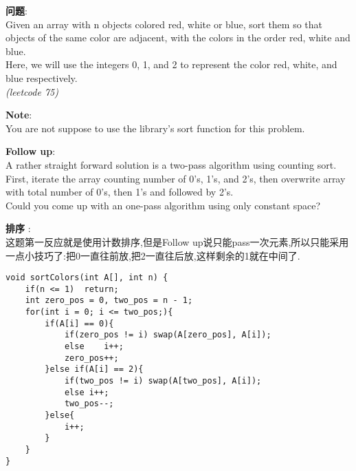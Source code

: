     
\begin{description}
    \item{\textbf{问题}}:\\
Given an array with n objects colored red, white or blue, sort them so that objects of the same color are adjacent, with the colors in the order red, white and blue.\\
Here, we will use the integers 0, 1, and 2 to represent the color red, white, and blue respectively.\\
\textit{(leetcode 75)}
	\item{\textbf{Note}}:\\
You are not suppose to use the library's sort function for this problem.
	\item{\textbf{Follow up}}:\\
A rather straight forward solution is a two-pass algorithm using counting sort.\\
First, iterate the array counting number of 0's, 1's, and 2's, then overwrite array with total number of 0's, then 1's and followed by 2's.\\
Could you come up with an one-pass algorithm using only constant space?\\
    \item{\textbf{排序}} : 
    \\这题第一反应就是使用计数排序,但是Follow up说只能pass一次元素,所以只能采用一点小技巧了:把0一直往前放,把2一直往后放,这样剩余的1就在中间了.
    \begin{lstlisting}
void sortColors(int A[], int n) {
	if(n <= 1)	return;
	int zero_pos = 0, two_pos = n - 1;
	for(int i = 0; i <= two_pos;){
		if(A[i] == 0){
			if(zero_pos != i) swap(A[zero_pos], A[i]);
			else	i++;
			zero_pos++;
		}else if(A[i] == 2){
			if(two_pos != i) swap(A[two_pos], A[i]);
			else i++;
			two_pos--;
		}else{
			i++;
		}
	}
}
    \end{lstlisting}
\end{description}
